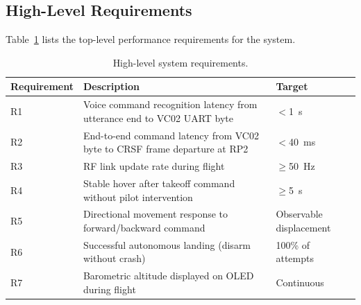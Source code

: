 \subsection{High-Level Requirements}

Table~\ref{tab:hlr} lists the top-level performance requirements for the system.

\begin{table}[htb!]
    \centering
    \caption{High-level system requirements.}
    \label{tab:hlr}
    \begin{tabularx}{\linewidth}{l X l}
        \hline
        \textbf{Requirement} & \textbf{Description} & \textbf{Target} \\
        \hline
        R1 & Voice command recognition latency from utterance end to VC02 UART byte &
            $<$1~s \\
        R2 & End-to-end command latency from VC02 byte to CRSF frame departure at RP2 &
            $<$40~ms \\
        R3 & RF link update rate during flight & $\geq$50~Hz \\
        R4 & Stable hover after takeoff command without pilot intervention &
            $\geq$5~s \\
        R5 & Directional movement response to forward/backward command & Observable
            displacement \\
        R6 & Successful autonomous landing (disarm without crash) & 100\% of attempts \\
        R7 & Barometric altitude displayed on OLED during flight & Continuous \\
        \hline
    \end{tabularx}
\end{table}

